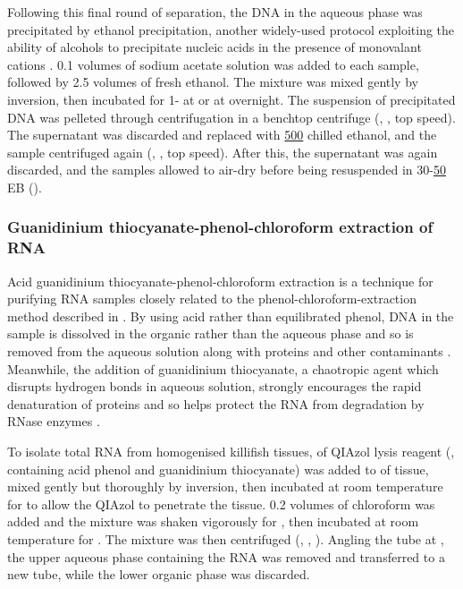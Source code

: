 Following this final round of separation, the DNA in the aqueous phase was precipitated by ethanol precipitation, another widely-used protocol exploiting the ability of alcohols to precipitate nucleic acids in the presence of monovalant cations \parencite{zumbo2012ethanol}. 0.1 volumes of  sodium acetate solution was added to each sample, followed by 2.5 volumes of fresh  ethanol. The mixture was mixed gently by inversion, then incubated for 1- at  or at  overnight. The suspension of precipitated DNA was pelleted through centrifugation in a benchtop centrifuge (, , top speed). The supernatant was discarded and replaced with \ul{500} chilled  ethanol, and the sample centrifuged again (, , top speed). After this, the supernatant was again discarded, and the samples allowed to air-dry before being resuspended in 30-\ul{50} EB (). 

\subsubsection{Guanidinium thiocyanate-phenol-chloroform extraction of RNA}
\label{sec:methods_molec_standard_qiazol}

Acid guanidinium thiocyanate-phenol-chloroform extraction is a technique for purifying RNA samples closely related to the phenol-chloroform-extraction method described in  \parencite{zumbo2012phenolchloroform}. By using acid rather than equilibrated phenol, DNA in the sample is dissolved in the organic rather than the aqueous phase and so is removed from the aqueous solution along with proteins and other contaminants \parencite{zumbo2012phenolchloroform,chomczynski2006trizol}. Meanwhile, the addition of guanidinium thiocyanate, a chaotropic agent which disrupts hydrogen bonds in aqueous solution, strongly encourages the rapid denaturation of proteins and so helps protect the RNA from degradation by RNase enzymes \parencite{zumbo2012phenolchloroform,chomczynski2006trizol}.

To isolate total RNA from homogenised killifish tissues,  of QIAzol lysis reagent (, containing acid phenol and guanidinium thiocyanate) was added to  of tissue, mixed gently but thoroughly by inversion, then incubated at room temperature for  to allow the QIAzol to penetrate the tissue. 0.2 volumes of chloroform was added and the mixture was shaken vigorously for , then incubated at room temperature for . The mixture was then centrifuged (, , ). Angling the tube at , the upper aqueous phase containing the RNA was removed and transferred to a new tube, while the lower organic phase was discarded.


